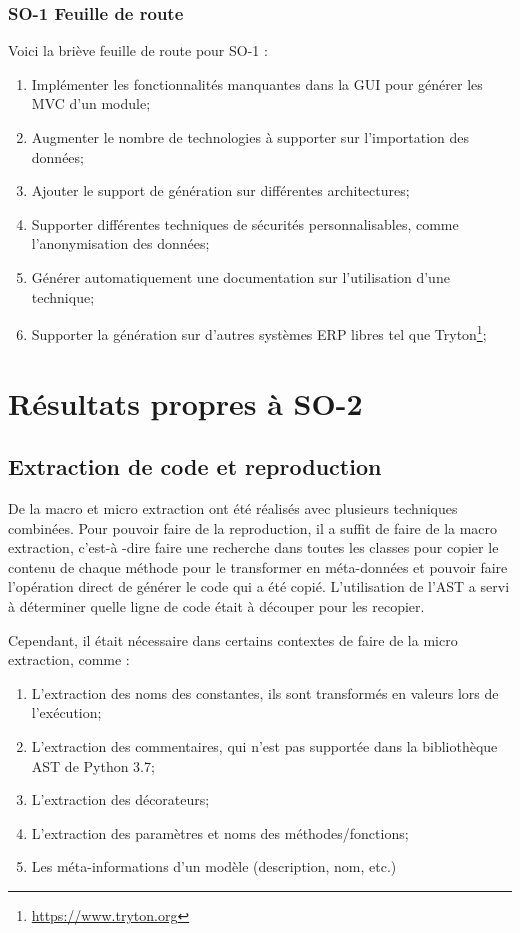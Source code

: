 \subsubsection{SO-1 Feuille de route}
Voici la briève feuille de route pour SO-1 :
\begin{enumerate}
    \item Implémenter les fonctionnalités manquantes dans la GUI pour générer les MVC d’un module;
    \item Augmenter le nombre de technologies à supporter sur l'importation des données;
    \item Ajouter le support de génération sur différentes architectures;
    \item Supporter différentes techniques de sécurités personnalisables, comme l’anonymisation des données;
    \item Générer automatiquement une documentation sur l’utilisation d’une technique;
    \item Supporter la génération sur d’autres systèmes ERP libres tel que Tryton\footnote{\url{https://www.tryton.org}};
\end{enumerate}

\section{Résultats propres à SO-2}

\subsection {Extraction de code et reproduction}

De la macro et micro extraction ont été réalisés avec plusieurs techniques combinées. Pour pouvoir faire de la reproduction, il a suffit de faire de la macro extraction, c'est-à -dire faire une recherche dans toutes les classes pour copier le contenu de chaque méthode pour le transformer en méta-données et pouvoir faire l’opération direct de générer le code qui a été copié. L’utilisation de l’AST a servi à déterminer quelle ligne de code était à découper pour les recopier.

Cependant, il était nécessaire dans certains contextes de faire de la micro extraction, comme : 
\begin{enumerate}
    \item L’extraction des noms des constantes, ils sont transformés en valeurs lors de l’exécution;
    \item L’extraction des commentaires, qui n’est pas supportée dans la bibliothèque AST de Python 3.7;
    \item L’extraction des décorateurs;
    \item L’extraction des paramètres et noms des méthodes/fonctions;
    \item Les méta-informations d’un modèle (description, nom, etc.)
\end{enumerate}

